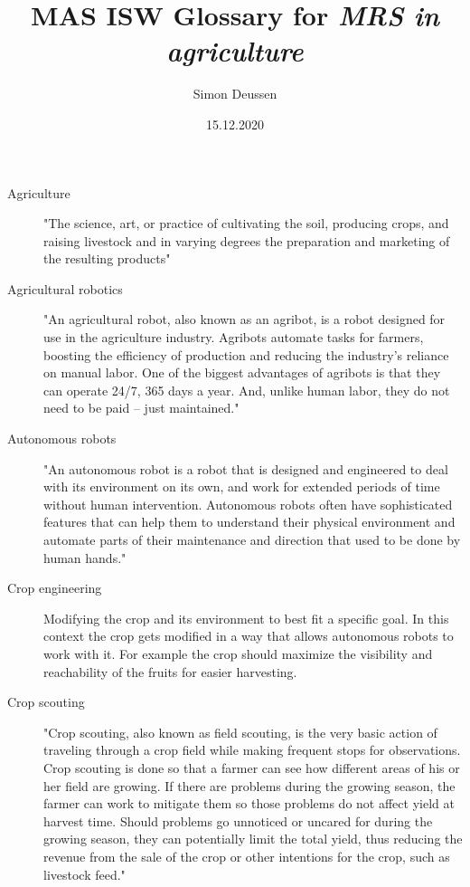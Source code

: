\documentclass{article}
\title{MAS ISW Glossary for \emph{MRS in agriculture}}
\date{15.12.2020}
\author{Simon Deussen}
\begin{document}
\maketitle
{}


\begin{description}
    \item[Agriculture] "The science, art, or practice of cultivating the soil, producing crops, and raising livestock and in varying degrees the preparation and marketing of the resulting products" \cite{MerriamWebster2020}
    \item[Agricultural robotics] "An agricultural robot, also known as an agribot, is a robot designed for use in the agriculture industry.
    Agribots automate tasks for farmers, boosting the efficiency of production and reducing the industry’s reliance on manual labor. 
    One of the biggest advantages of agribots is that they can operate 24/7, 365 days a year. And, unlike human labor, they do not need to be paid – just maintained." \cite{MarketBusinessNews2020} 
    \item[Autonomous robots] "An autonomous robot is a robot that is designed and engineered to deal with its environment on its own, and work for extended periods of time without human intervention. 
    Autonomous robots often have sophisticated features that can help them to understand their physical environment and automate parts of their maintenance and direction that used to be done by human hands." \cite{Technopedia2020}    
    \item[Crop engineering]  Modifying the crop and its environment to best fit a specific goal. In this context the crop gets modified in a way that allows autonomous robots to work with it. For example the crop should maximize the visibility and reachability of the fruits for easier harvesting.
    \item[Crop scouting]  "Crop scouting, also known as field scouting, is the very basic action of traveling through a crop field while making frequent stops for observations. Crop scouting is done so that a farmer can see how different areas of his or her field are growing. If there are problems during the growing season, the farmer can work to mitigate them so those problems do not affect yield at harvest time. Should problems go unnoticed or uncared for during the growing season, they can potentially limit the total yield, thus reducing the revenue from the sale of the crop or other intentions for the crop, such as livestock feed." \cite{Farms2020}

\end{description}
\end{document}
